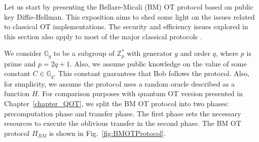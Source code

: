 Let us start by presenting the Bellare-Micali (BM) OT protocol \cite{BM89} based on public key Diffie-Hellman. This exposition aims to shed some light on the issues related to classical OT implementations. The security and efficiency issues explored in this section also apply to most of the major classical protocols \cite{EGL85, NP01, CO15}.

We consider $\mathbb{G}_q$ to be a subgroup of $\mathbb{Z}^*_p$ with generator $g$ and order $q$, where $p$ is prime and $p = 2q + 1$. Also, we assume public knowledge on the value of some constant $C\in \mathbb{G}_q$. This constant guarantees that Bob follows the protocol. Also, for simplicity, we assume the protocol uses a random oracle described as a function $H$. For comparison purposes with quantum OT version presented in Chapter~\ref{chapter_QOT}, we split the BM OT protocol into two phases: precomputation phase and transfer phase. The first phase sets the necessary resources to execute the oblivious transfer in the second phase. The BM OT protocol $\Pi_{BM}$ is shown in Fig.~\ref{fig:BMOTProtocol}.


